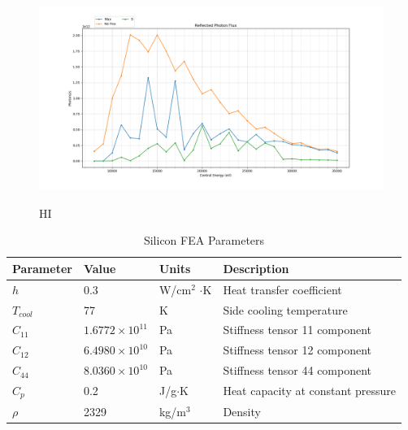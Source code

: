 \documentclass[preprint]{iucr}              %
\begin{document}
\begin{figure}
\caption{HI}
\includegraphics{images/maxangleflux.png}
\label{fig:maxangleflux}
\end{figure}

\begin{table}

\caption{Silicon FEA Parameters}
\begin{tabular}{@{}llll@{}}
Parameter   & Value                   & Units                     & Description                        \\
\hline
$h$           & 0.3                     & W/cm$^2$ $\cdot$K          & Heat transfer coefficient          \\
$T_{cool}$  & 77                      & K                         & Side cooling temperature           \\
$C_{11}$    & $1.6772\times 10^{11}$  & Pa                        & Stiffness tensor 11 component      \\
$C_{12}$    & $6.4980\times 10^{10}$  & Pa                        & Stiffness tensor 12 component      \\
$C_{44}$    & $8.0360\times 10^{10}$  & Pa                        & Stiffness tensor 44 component      \\
$C_p$       & 0.2                     & J/g$\cdot$K               & Heat capacity at constant pressure \\
$\rho$      &  2329                   & kg/m$^3$                  & Density                            \\
\end{tabular}
\label{siliconFEA}
\end{table}
\end{document}
